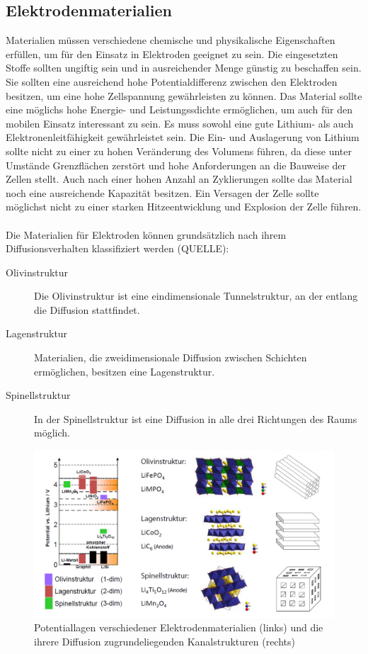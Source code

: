 \documentclass[a4paper, 11pt, headsepline,footsepline,twoside,abstract]{scrbook}
\begin{document}
\subsection{Elektrodenmaterialien}
Materialien müssen verschiedene chemische und physikalische Eigenschaften erfüllen, um für den Einsatz in Elektroden geeignet zu sein. Die eingesetzten Stoffe sollten ungiftig sein und in ausreichender Menge günstig zu beschaffen sein. Sie sollten eine ausreichend hohe Potentialdifferenz zwischen den Elektroden besitzen, um eine hohe Zellspannung gewährleisten zu können. Das Material sollte eine möglichs hohe Energie- und Leistungssdichte ermöglichen, um auch für den mobilen Einsatz interessant zu sein. Es muss sowohl eine gute Lithium- als auch Elektronenleitfähigkeit gewährleistet sein. Die Ein- und Auslagerung von Lithium sollte nicht zu einer zu hohen Veränderung des Volumens führen, da diese unter Umstände Grenzflächen zerstört und hohe Anforderungen an die Bauweise der Zellen stellt. Auch nach einer hohen Anzahl an Zyklierungen sollte das Material noch eine ausreichende Kapazität besitzen. Ein Versagen der Zelle sollte möglichst nicht zu einer starken Hitzeentwicklung und Explosion der Zelle führen.
\\\\
Die Materialien für Elektroden können grundsätzlich nach ihrem Diffusionsverhalten klassifiziert werden (QUELLE):
\begin{description}
\item[Olivinstruktur] Die Olivinstruktur ist eine eindimensionale Tunnelstruktur, an der entlang die Diffusion stattfindet.
\item[Lagenstruktur] Materialien, die zweidimensionale Diffusion zwischen Schichten ermöglichen, besitzen eine Lagenstruktur.
\item[Spinellstruktur] In der Spinellstruktur ist eine Diffusion in alle drei Richtungen des Raums möglich.
\end{description}

\begin{figure}
	\centering
	\includegraphics[width=1.0\columnwidth]{images/strukturen_elektroden.png}
	\caption{Potentiallagen verschiedener Elektrodenmaterialien (links) und die ihrere Diffusion zugrundeliegenden Kanalstrukturen (rechts) \cite{bub_skript}}
	\label{strukturen_elektroden}
\end{figure}
\end{document}
